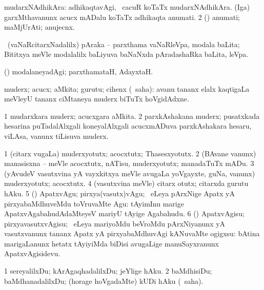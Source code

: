 \bentry
{}
\gl{\nA}
\bmng
\bnum
{} mudarxNAdhikAra: 
\banum
{} adhikaqtavAgi, \roVkAyx\ cacuR koTaTx mudarxNAdhikAra. 
 (Iga) garxMthavanunx acucx mADalu koTaTx adhikaqta anumati. 
\eanum
\numie
\num{2} (\rUpa) anumati; maMjUrAti; anujecnx. 
\enum
\emng
\eentry

\bentry
{}
\gl{\nA}
\bmng
\It\ (vaNaRcitarxNadalilx) pAraka -- parxthama vaNaRleVpa, modala baLita; Bititxya meVle modalalilx baLiyuva baNaNxda pAradashaRka baLita, leVpa. 
\emng
\eentry

\bentry
{}
\gl{\kirxvi}
\bmng
(\pArxparx) modalaneyadAgi; parxthamataH, AdayxtaH. 
\emng
\eentry

\bentry
{}
\gl{\nA}
\bmng
muderx; acucx; aMkita; gurutu; cihenx (\rUpa\ saha):  avanu tananx elalx kaqtigaLa meVleyU tananx ciMtaneya muderx biTuTx hoVgidAdxne. 
\emng

\noindent
\gl{\pagu}
\bmng
\bnum
\num{1}  mudarxkara muderx; acucxgara aMkita. 
\num{2}  parxkAshakana muderx; pusatxkada hesarina puTadalAlxgali koneyalAlxgali acucxmADuva parxkAshakara hesaru, viLAsa, \mo vanunx tiLisuva muderx. 
\enum
\emng
\eentry

\bentry
{}
\gl{\sakirx}
\bmng
\bnum
\num{1} (citarx \mo vugaLa) muderxyotutx; acocxtutx; Thasesxyotutx. 
\num{2} (BAvane \mo vanunx) manasisxna -- meVle acocxtutx, nATisu, muderxyotutx; manadaTuTx mADu. 
\num{3} (yAvudeV vasutxvina yA vayxkitxya meVle avugaLa yoVgayxte, guNa, \mo vanunx) muderxyotutx; acocxtutx. 
\num{4} (vasutxvina meVle) citarx otutx; citarxda gurutu hAku. 
\num{5} (\mashA) ApatxvAgu; pirxya(vasutx)vAgu; \kanmu\ eLeya pArxNige Apatx yA pirxyabaMdhuveMdu toVruvaMte Agu:  tAyimInu marige ApatxvAgabahudAdaMteyeV mariyU tAyige Agabahudu. 
\num{6} (\mashA) ApatxvAgisu; pirxyavasutxvAgisu; \kanmu\ eLeya mariyoMdu beVroMdu pArxNiyanunx yA vasutxvanunx tananx Apatx yA pirxyabaMdhuvAgi kANuvaMte ogigxsu:  bAtina marigaLanunx hetatx tAyiyiMda biDisi avugaLige manuSayxranunx ApatxvAgisidevu. 
\enum
\emng
\eentry

\bentry
{}
\gl{\sakirx}
\bmng
\bnum
\num{1} sereyalilxDu; kArAgaqhadalilxDu; jeYlige hAku. 
\num{2} baMdhisiDu; baMdhanadalilxDu; (horage hoVgadaMte) kUDi hAku (\rUpa\ saha). 
\enum
\emng
\eentry

